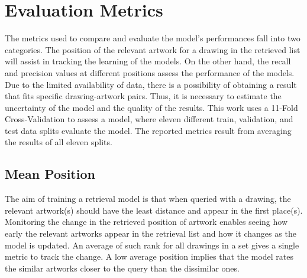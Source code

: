 \section{Evaluation Metrics}\label{chap:4:sec:metrics-descrp}

The metrics used to compare and evaluate the model's performances fall into two categories. The position of the relevant artwork for a drawing in the retrieved list will assist in tracking the learning of the models. On the other hand, the recall and precision values at different positions assess the performance of the models. Due to the limited availability of data, there is a possibility of obtaining a result that fits specific drawing-artwork pairs. Thus, it is necessary to estimate the uncertainty of the model and the quality of the results. This work uses a 11-Fold Cross-Validation to assess a model, where eleven different train, validation, and test data splits evaluate the model. The reported metrics result from averaging the results of all eleven splits.

\subsection{Mean Position}

The aim of training a retrieval model is that when queried with a drawing, the relevant artwork(s) should have the least distance and appear in the first place(s). Monitoring the change in the retrieved position of artwork enables seeing how early the relevant artworks appear in the retrieval list and how it changes as the model is updated. An average of such rank for all drawings in a set gives a single metric to track the change. A low average position implies that the model rates the similar artworks closer to the query than the dissimilar ones. 

